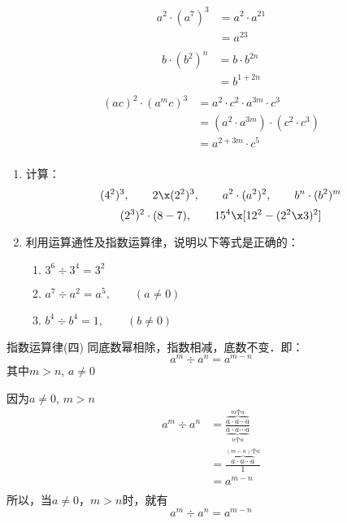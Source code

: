 \begin{solution}
	\begin{align*}
	a^2\cdot (a^7)^3&=a^2\cdot a^{21} \tag{指数运算律（三）}\\
	&= a^{23} \tag{指数运算律（一）}\\
	\end{align*}
	\begin{align*}
	b\cdot (b^2)^n&=b\cdot b^{2n} \tag{指数运算律（三）}\\
	&= b^{1+2n} \tag{指数运算律（一）}\\
	\end{align*}
	\begin{align*}
	(ac)^2\cdot (a^m c)^3&=a^2\cdot c^2\cdot a^{3m}\cdot c^3 \tag{指数运算律（三）}\\
	&=(a^2\cdot a^{3m})\cdot (c^2\cdot c^3) \tag{乘法交换、结合律}\\
	&= a^{2+3m}\cdot c^5 \tag{指数运算律（一）}\\
	\end{align*}        
\end{solution}

\begin{ex}
	\begin{enumerate}
		\item 计算：
		$$(4^2)^3,\qquad 2 \x (2^2)^3,\qquad a^2\cdot (a^2)^2,\qquad b^n\cdot (b^2)^m$$
		$$(2^3)^2 \cdot (8-7),\qquad       15^4 \x [12^2-(2^2 \x3)^2]$$
		\item 利用运算通性及指数运算律，说明以下等式是正确的：
		\begin{enumerate}
			\item $3^6\div 3^4=3^2$
			\item $a^7\div a^2=a^5,\qquad (a\ne 0)$
			\item $b^4\div b^4=1, \qquad (b\ne 0)$
		\end{enumerate}
		
	\end{enumerate}   
\end{ex}

\begin{blk}{指数运算律(四)}
	同底数幂相除，指数相减，底数不变．即：
	\[a^m \div a^n=a^{m-n}\]
	其中$m>n$,  $a\ne 0$
\end{blk}

\begin{rmk}
	因为$a\ne 0$, $m>n$
	\begin{align*}
	a^m \div a^n&=\frac{\overbrace{a\cdot a\cdots a}^{\text{$m$个$a$}}}{\underbrace{a\cdot a\cdots a}_{\text{$n$个$a$}}}  \tag{乘方的意义}\\
	&=\frac{\overbrace{a\cdot a\cdots a}^{\text{$(m-n)$个$a$}}}{1}  \tag{除法的性质}\\
	&=a^{m-n}\tag{乘方的意义}\\
	\end{align*}    
	所以，当$a\ne 0$，$m>n$时，就有
	\[a^m \div a^n=a^{m-n}\]
\end{rmk}

